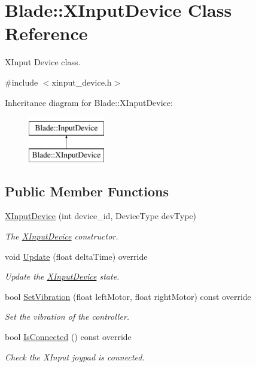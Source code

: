 \hypertarget{class_blade_1_1_x_input_device}{}\section{Blade\+:\+:X\+Input\+Device Class Reference}
\label{class_blade_1_1_x_input_device}


X\+Input Device class.  




{\ttfamily \#include $<$xinput\+\_\+device.\+h$>$}

Inheritance diagram for Blade\+:\+:X\+Input\+Device\+:\begin{figure}[H]
\begin{center}
\leavevmode
\includegraphics[height=2.000000cm]{class_blade_1_1_x_input_device}
\end{center}
\end{figure}
\subsection*{Public Member Functions}
\begin{DoxyCompactItemize}
\item 
\hyperlink{class_blade_1_1_x_input_device_a6867d41263a24e24767fe7cb02930b0d}{X\+Input\+Device} (int device\+\_\+id, Device\+Type dev\+Type)
\begin{DoxyCompactList}\small\item\em The \hyperlink{class_blade_1_1_x_input_device}{X\+Input\+Device} constructor. \end{DoxyCompactList}\item 
void \hyperlink{class_blade_1_1_x_input_device_a32a94ba12dd032a93a56b766073c7159}{Update} (float delta\+Time) override
\begin{DoxyCompactList}\small\item\em Update the \hyperlink{class_blade_1_1_x_input_device}{X\+Input\+Device} state. \end{DoxyCompactList}\item 
bool \hyperlink{class_blade_1_1_x_input_device_a9119d7193d51c1003ee6bb8074518ef4}{Set\+Vibration} (float left\+Motor, float right\+Motor) const override
\begin{DoxyCompactList}\small\item\em Set the vibration of the controller. \end{DoxyCompactList}\item 
bool \hyperlink{class_blade_1_1_x_input_device_a4eb3b23fabf556140c0ab14dd44a7009}{Is\+Connected} () const override
\begin{DoxyCompactList}\small\item\em Check the X\+Input joypad is connected. \end{DoxyCompactList}\end{DoxyCompactItemize}
